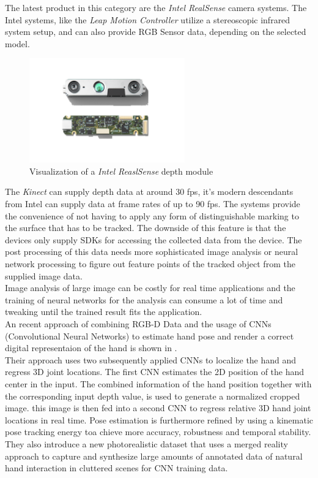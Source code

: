 The latest product in this category are the \textit{Intel RealSense} camera systems\cite{IntelCorporation.2018}. The Intel systems, like the\textit{ Leap Motion Controller} utilize a stereoscopic infrared system setup, and can also provide RGB Sensor data, depending on the selected model.
\begin{figure}[H]
\centering
\includegraphics[width=0.6\textwidth]{images/RealSense.png}
\caption{Visualization of a \textit{Intel ReaslSense} depth module\cite{IntelCorporation.2018}}
\label{img:leapMotion} 
\end{figure}
The \textit{Kinect} can supply depth data at around 30 fps, it's modern  descendants from Intel can supply data at frame rates of up to 90 fps. The systems provide the convenience of not having to apply any form of distinguishable marking to the surface that has to be tracked. The downside of this feature is that the devices only supply SDKs for accessing the collected data from the device. The post processing of this data needs more sophisticated image analysis or neural network processing to figure out feature points of the tracked object from the supplied image data\cite{JamieShotton.2011,Oikonomidis.2011b}.\\Image analysis of large image can be costly for real time applications and the training of neural networks for the analysis can consume a lot of time and tweaking until the trained result fits the application.
\\An recent approach of combining RGB-D Data and the usage of CNNs (Convolutional Neural Networks) to estimate hand pose and render a correct digital representaion of the hand is shown in \cite{FranziskaMueller.2017}.
\\Their approach uses two subsequently applied CNNs to localize the hand and regress 3D joint locations. The first CNN estimates the 2D position of the hand center in the input. The combined information of the hand position together with the corresponding input depth value, is used to generate a normalized cropped image. this image is then fed into a second CNN to regress relative 3D hand joint
locations in real time. Pose estimation is furthermore refined by using a kinematic pose tracking energy toa chieve more accuracy, robustness and
temporal stability.
\\They also introduce a new photorealistic dataset that uses a merged reality
approach to capture and synthesize large amounts of annotated
data of natural hand interaction in cluttered scenes for CNN training data.






